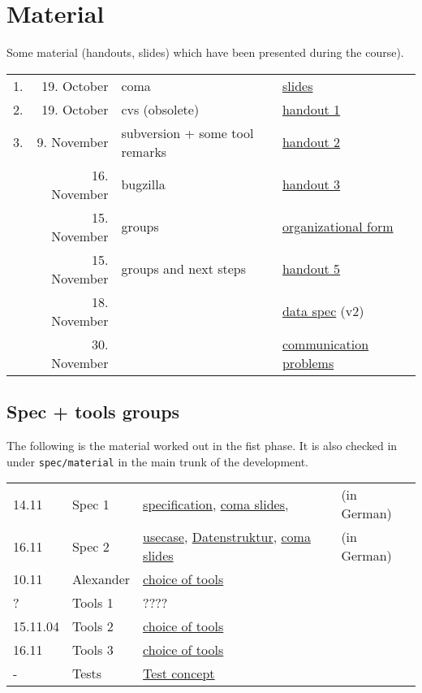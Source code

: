 
\section*{Material}

Some material (handouts, slides) which have been presented during the
course).

\begin{tabular}{r@{\quad\quad}rll}
  \hline
  1. & 19. October & coma  & 
  \href{slides/main-coma.pdf}{slides}
  \\
  2. & 19. October & cvs (obsolete) & \href{handouts/handout1.pdf}{handout 1}
  \\
  3. & 9. November & subversion + some tool remarks &
  \href{handouts/handout2.pdf}{handout 2}
  \\
   & 16. November & bugzilla &
  \href{handouts/handout3.pdf}{handout 3}
  \\
   & 15. November & groups &
  \href{handouts/handout4.pdf}{organizational form}
  \\
   & 15. November & groups and next steps &
  \href{handouts/handout5.pdf}{handout 5}
  \\\hline 
   & 18. November &  &
  \href{spec/v2/main.pdf}{data spec} (v2)
  \\\hline 
   & 30. November &  &
  \href{handouts/handout6.pdf}{communication problems}
  \\
\end{tabular}




\subsection*{Spec + tools groups}
\label{sec:material.spec-tools}%

The following is the material worked out in the fist phase. It is also
checked in under \texttt{spec/material} in the main trunk of the
development.


\begin{tabular}{llll}
  14.11 & Spec 1 & 
  \href{spec/material/spec1/spezifikation.pdf}{specification}, 
  \href{spec/material/spec1/slides.pdf}{coma slides}, 
  & (in German)
  \\
  16.11 & Spec 2 & 
  \href{spec/material/spec2/usecase.pdf}{usecase}, 
  \href{spec/material/spec2/datenstruktur.ps}{Datenstruktur}, 
  \href{spec/material/spec2/slides.pdf}{coma slides}
  & (in German)
  \\
  10.11 & Alexander & \href{spec/material/derenbach/tools.pdf}{choice of tools}
  \\
  ?  & Tools 1 & ????
  \\
  15.11.04 & Tools 2 &
  \href{spec/material/tools2/tools.pdf}{choice of tools}
  \\
  16.11 & Tools 3 & \href{spec/material/tools3/tools.pdf}{choice of tools}
  \\
  - & Tests & \href{spec/material/tests/tests.txt}{Test concept}
\end{tabular}




